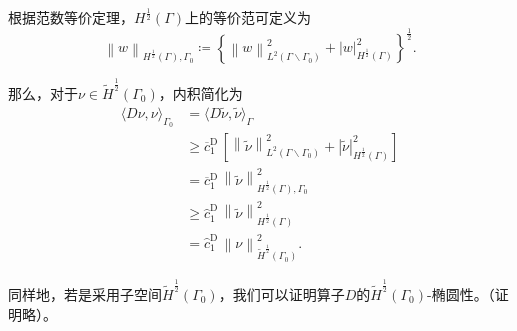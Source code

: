 根据范数等价定理，$H^{\frac{1}{2}}(\Gamma)$上的等价范可定义为
\begin{equation*}
  \left\| w \right\|_{H^{\frac{1}{2}}(\Gamma), \Gamma_{0}}
  \coloneqq
  \left\{
  \left\| w \right\|_{L^{2}(\Gamma \backslash \Gamma_{0})}^{2}
  + \left| w \right|_{H^{\frac{1}{2}}(\Gamma)}^{2}
  \right\}^{\frac{1}{2}}.
\end{equation*}

那么，对于$\nu \in \widetilde{H}^{\frac{1}{2}}(\Gamma_{0})$，内积简化为
\begin{equation*}
  \begin{split}
    \langle D \nu, \nu \rangle_{\Gamma_{0}}
    & = \langle D \widetilde{\nu}, \widetilde{\nu} \rangle_{\Gamma} \\
    & \ge \overline{c}_{1}^{\text{D}} \,
    \left[
    \left\| \widetilde{\nu} \right\|_{L^{2}(\Gamma \backslash \Gamma_{0})}^{2}
    + \left| \widetilde{\nu} \right|_{H^{\frac{1}{2}}(\Gamma)}^{2}
    \right] \\
    & = \overline{c}_{1}^{\text{D}} \,
    \left\| \widetilde{\nu} \right\|_{H^{\frac{1}{2}}(\Gamma), \Gamma_{0}}^{2} \\
    & \ge \widehat{c}_{1}^{\text{D}} \,
    \left\| \widetilde{\nu} \right\|_{H^{\frac{1}{2}}(\Gamma)}^{2} \\
    & = \widehat{c}_{1}^{\text{D}} \,
    \left\| \nu \right\|_{\widetilde{H}^{\frac{1}{2}}(\Gamma_{0})}^{2}.
  \end{split}
\end{equation*}

同样地，若是采用子空间$\widetilde{H}^{\frac{1}{2}}(\Gamma_{0})$，我们可以证明算子$D$的$\widetilde{H}^{\frac{1}{2}}(\Gamma_{0})$-椭圆性。（证明略）。

